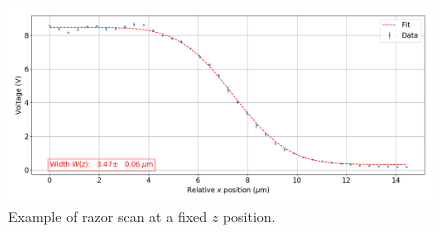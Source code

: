 \begin{figure}
\centering
\includegraphics[width=1\textwidth]{img/razorscan}
\caption{Example of razor scan at a fixed $z$ position.}
\label{examplerazorscan}
\end{figure}


